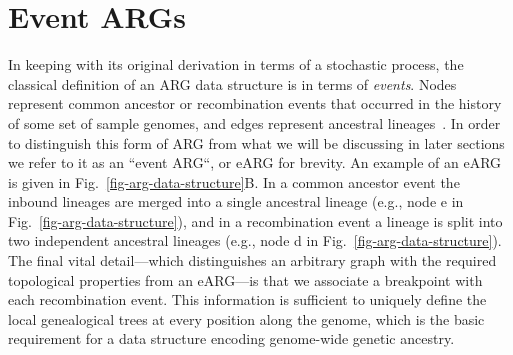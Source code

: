 \documentclass{article}
\newcommand{\noderef}[1]{\textsf{#1}}
\begin{document}
\section*{Event ARGs}\label{eARG}
In keeping with its original derivation in terms of a stochastic
process, the classical definition of an ARG data structure is
in terms of \emph{events}. Nodes represent
common ancestor or recombination events that occurred in the
history of some set of sample genomes, and edges represent ancestral
lineages~\citep{griffiths1996ancestral}.
In order to distinguish this form of ARG from what we will be discussing
in later sections we refer to it as an ``event ARG``, or eARG for brevity.
An example of an eARG
is given in Fig.~\ref{fig-arg-data-structure}B.
In a common ancestor event the inbound lineages are merged into a
single ancestral lineage (e.g., node \noderef{e}
in Fig.~\ref{fig-arg-data-structure}), and in a recombination
event a lineage is split into two independent
ancestral lineages (e.g., node \noderef{d}
in Fig.~\ref{fig-arg-data-structure}). The final vital
detail---which distinguishes an arbitrary graph with the required topological
properties from an eARG---is that we associate a breakpoint with each recombination
event. This information is sufficient to uniquely
define the local genealogical trees at every position along the genome,
which is the basic requirement for a data structure encoding
genome-wide genetic ancestry.
\end{document}
